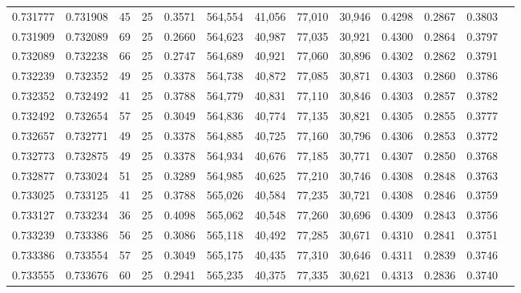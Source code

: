 \begin{tabular}{rrrrrrrrrrrrr}
0.731777 & 0.731908 &    45 &  25 &                                     0.3571 & 564,554 &  41,056 &  77,010 &  30,946 & 0.4298 & 0.2867 & 0.3803 \\
0.731909 & 0.732089 &    69 &  25 &                                     0.2660 & 564,623 &  40,987 &  77,035 &  30,921 & 0.4300 & 0.2864 & 0.3797 \\
0.732089 & 0.732238 &    66 &  25 &                                     0.2747 & 564,689 &  40,921 &  77,060 &  30,896 & 0.4302 & 0.2862 & 0.3791 \\
0.732239 & 0.732352 &    49 &  25 &                                     0.3378 & 564,738 &  40,872 &  77,085 &  30,871 & 0.4303 & 0.2860 & 0.3786 \\
0.732352 & 0.732492 &    41 &  25 &                                     0.3788 & 564,779 &  40,831 &  77,110 &  30,846 & 0.4303 & 0.2857 & 0.3782 \\
0.732492 & 0.732654 &    57 &  25 &                                     0.3049 & 564,836 &  40,774 &  77,135 &  30,821 & 0.4305 & 0.2855 & 0.3777 \\
0.732657 & 0.732771 &    49 &  25 &                                     0.3378 & 564,885 &  40,725 &  77,160 &  30,796 & 0.4306 & 0.2853 & 0.3772 \\
0.732773 & 0.732875 &    49 &  25 &                                     0.3378 & 564,934 &  40,676 &  77,185 &  30,771 & 0.4307 & 0.2850 & 0.3768 \\
0.732877 & 0.733024 &    51 &  25 &                                     0.3289 & 564,985 &  40,625 &  77,210 &  30,746 & 0.4308 & 0.2848 & 0.3763 \\
0.733025 & 0.733125 &    41 &  25 &                                     0.3788 & 565,026 &  40,584 &  77,235 &  30,721 & 0.4308 & 0.2846 & 0.3759 \\
0.733127 & 0.733234 &    36 &  25 &                                     0.4098 & 565,062 &  40,548 &  77,260 &  30,696 & 0.4309 & 0.2843 & 0.3756 \\
0.733239 & 0.733386 &    56 &  25 &                                     0.3086 & 565,118 &  40,492 &  77,285 &  30,671 & 0.4310 & 0.2841 & 0.3751 \\
0.733386 & 0.733554 &    57 &  25 &                                     0.3049 & 565,175 &  40,435 &  77,310 &  30,646 & 0.4311 & 0.2839 & 0.3746 \\
0.733555 & 0.733676 &    60 &  25 &                                     0.2941 & 565,235 &  40,375 &  77,335 &  30,621 & 0.4313 & 0.2836 & 0.3740 \\

\end{tabular}
